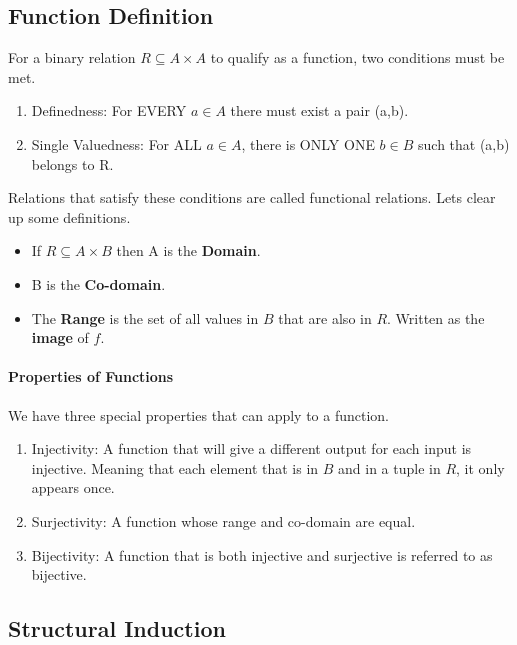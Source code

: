 \subsection{Function Definition} For a binary relation $R \subseteq A \times A$ to qualify as a function, two conditions must be met.
\begin{enumerate}
	\item Definedness: For EVERY $a \in A$ there must exist a pair (a,b).
	\item Single Valuedness: For ALL $a \in A$, there is ONLY ONE $b \in B$ such that (a,b) belongs to R.
\end{enumerate}
Relations that satisfy these conditions are called functional relations. Lets clear up some definitions.
\begin{itemize}
	\item If $R \subseteq A \times B$ then A is the \textbf{Domain}.
	\item B is the \textbf{Co-domain}.
	\item The \textbf{Range} is the set of all values in $B$ that are also in $R$. Written as the \textbf{image} of $f$.
\end{itemize}

\paragraph{Properties of Functions} We have three special properties that can apply to a function. 
\begin{enumerate}
	\item Injectivity: A function that will give a different output for each input is injective. Meaning that each element that is in $B$ and in a tuple in $R$, it only appears once.
	\item Surjectivity: A function whose range and co-domain are equal.
	\item Bijectivity: A function that is both injective and surjective is referred to as bijective.
\end{enumerate}

\subsection{Structural Induction}

